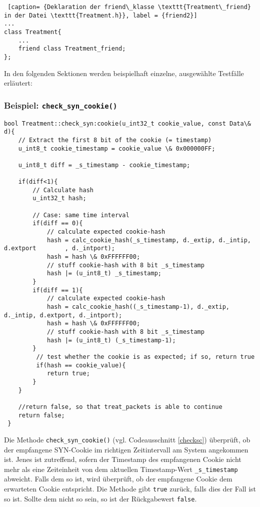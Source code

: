 \documentclass[../review_3.tex]{subfiles}
\begin{document}
\begin{lstlisting} [caption= {Deklaration der friend\_klasse \texttt{Treatment\_friend} in der Datei \texttt{Treatment.h}}, label = {friend2}]
...
class Treatment{
    ...
    friend class Treatment_friend;
};\end{lstlisting}

In den folgenden Sektionen werden beispielhaft einzelne, ausgewählte Testfälle erläutert:
\subsubsection{Beispiel: \texttt{check\_syn\_cookie()}}
\begin{lstlisting}[caption= {Methode: \texttt{check\_syn\_cookie()} in \texttt{Treatment.cpp}}, label=checksc]
bool Treatment::check_syn:cookie(u_int32_t cookie_value, const Data\& d){
    // Extract the first 8 bit of the cookie (= timestamp)
    u_int8_t cookie_timestamp = cookie_value \& 0x000000FF;
    
    u_int8_t diff = _s_timestamp - cookie_timestamp;
    
    if(diff<1){
        // Calculate hash
        u_int32_t hash;
        
        // Case: same time interval
        if(diff == 0){
            // calculate expected cookie-hash
            hash = calc_cookie_hash(_s_timestamp, d._extip, d._intip, d.extport        , d._intport);
            hash = hash \& 0xFFFFFF00;
            // stuff cookie-hash with 8 bit _s_timestamp
            hash |= (u_int8_t) _s_timestamp;
        }
        if(diff == 1){
            // calculate expected cookie-hash
            hash = calc_cookie_hash((_s_timestamp-1), d._extip, d._intip, d.extport, d._intport);
            hash = hash \& 0xFFFFFF00;
            // stuff cookie-hash with 8 bit _s_timestamp
            hash |= (u_int8_t) (_s_timestamp-1);
        }
         // test whether the cookie is as expected; if so, return true
         if(hash == cookie_value){
            return true;
        }
    }
       
    //return false, so that treat_packets is able to continue
    return false;
 }\end{lstlisting}
Die Methode \texttt{check\_syn\_cookie()} (vgl. Codeausschnitt \ref{checksc}) überprüft, ob der empfangene SYN-Cookie im richtigen Zeitintervall am System angekommen ist. Jenes ist zutreffend, sofern der Timestamp des empfangenen Cookie nicht mehr als eine Zeiteinheit von dem aktuellen Timestamp-Wert \texttt{\_s\_timestamp} abweicht. Falls dem so ist, wird überprüft, ob der empfangene Cookie dem erwarteten Cookie entspricht. Die Methode gibt \texttt{true} zurück, falls dies der Fall ist so ist. Sollte dem nicht so sein, so ist der Rückgabewert \texttt{false}.
\end{document}
